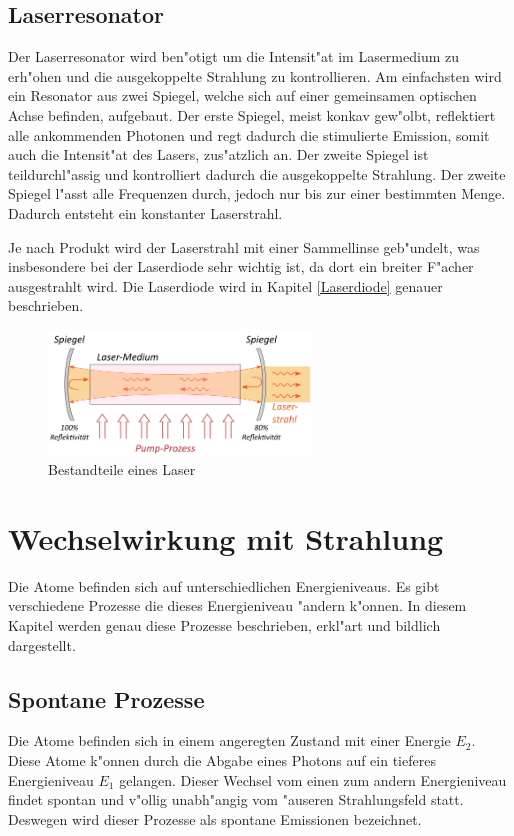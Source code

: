\begin{refsection}
\subsection{Laserresonator}
Der Laserresonator wird ben"otigt um die Intensit"at im 
Lasermedium zu erh"ohen und die ausgekoppelte Strahlung 
zu kontrollieren. Am einfachsten wird ein Resonator aus 
zwei Spiegel, welche sich auf einer gemeinsamen
optischen Achse befinden, aufgebaut. Der erste Spiegel, meist konkav 
gew"olbt, reflektiert alle ankommenden Photonen und regt 
dadurch die stimulierte Emission, somit auch die Intensit"at des Lasers, zus"atzlich an. Der zweite Spiegel 
ist teildurchl"assig und kontrolliert dadurch die 
ausgekoppelte Strahlung.
Der zweite Spiegel l"asst alle Frequenzen durch, jedoch nur
bis zur einer bestimmten Menge.   
Dadurch entsteht ein konstanter Laserstrahl.

Je nach Produkt wird der Laserstrahl mit einer Sammellinse geb"undelt, 
was insbesondere bei der Laserdiode sehr wichtig ist,
da dort ein breiter F"acher ausgestrahlt wird. Die Laserdiode wird in Kapitel \ref{Laserdiode}
genauer beschrieben.

\begin{figure}
\center
\includegraphics[width=7cm]{laser/bilder/aufbau.png}
\caption{Bestandteile eines Laser \cite{Aufbau}}
\label{Laser Aufbau}
\end{figure}


\section{Wechselwirkung mit Strahlung
\label{Wechselwirkung}}
Die Atome befinden sich auf unterschiedlichen Energieniveaus. 
Es gibt verschiedene Prozesse die dieses Energieniveau "andern k"onnen.
In diesem Kapitel werden genau diese Prozesse beschrieben, erkl"art und
bildlich dargestellt.

\subsection{Spontane Prozesse}
\label{Spontane Prozesse}
%
Die Atome befinden sich in einem angeregten Zustand mit einer Energie $E_2$. 
Diese Atome k"onnen durch die Abgabe eines Photons auf ein tieferes
Energieniveau $E_1$ gelangen.
Dieser Wechsel vom einen zum andern Energieniveau findet spontan
und v"ollig unabh"angig vom "auseren Strahlungsfeld statt.
Deswegen wird dieser Prozesse als spontane Emissionen bezeichnet.


\end{refsection}

